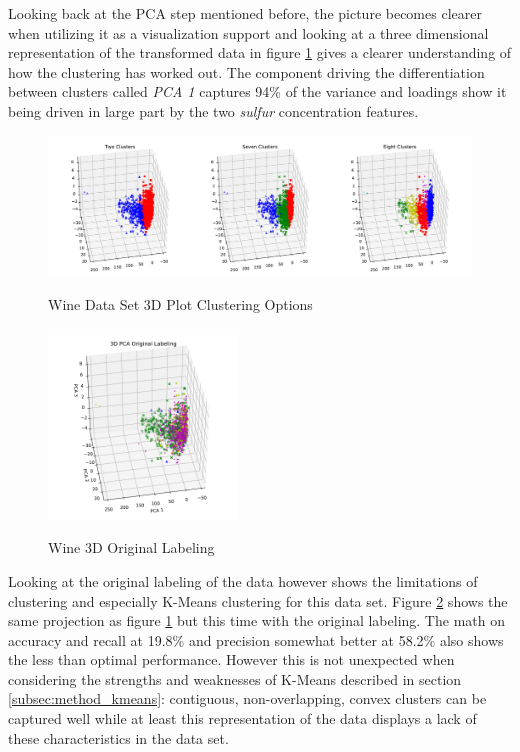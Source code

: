 Looking back at the PCA step mentioned before, the picture becomes clearer when utilizing it as a visualization support and looking at a three dimensional representation of the transformed data in figure \ref{fig:kmeans_wine_3d_multi} gives a clearer understanding of how the clustering has worked out. The component driving the differentiation between clusters called \textit{PCA 1} captures 94\% of the variance and loadings show it being driven in large part by the two \textit{sulfur} concentration features.

\vspace{-0.5cm}
\begin{figure}[H]
\caption{Wine Data Set 3D Plot Clustering Options}
\centering
\includegraphics[width=1.0\textwidth]{images/kmeans_wine_3d_multi.pdf}
\label{fig:kmeans_wine_3d_multi}
\end{figure}

\vspace{-0.5cm}
\begin{figure}
  \centering
    \includegraphics[trim={1cm 0cm 1cm 1cm},width=0.45\textwidth, clip]{images/kmeans_wine_pca_original.pdf}
  \label{fig:kmeans_wine_pca_original}
  \caption{Wine 3D Original Labeling}
\end{figure}

Looking at the original labeling of the data however shows the limitations of clustering and especially K-Means clustering for this data set. Figure \ref{fig:kmeans_wine_pca_original} shows the same projection as figure \ref{fig:kmeans_wine_3d_multi} but this time with the original labeling. The math on accuracy and recall at 19.8\% and precision somewhat better at 58.2\% also shows the less than optimal performance. However this is not unexpected when considering the strengths and weaknesses of K-Means described in section \ref{subsec:method_kmeans}: contiguous, non-overlapping, convex clusters can be captured well while at least this representation of the data displays a lack of these characteristics in the data set.


